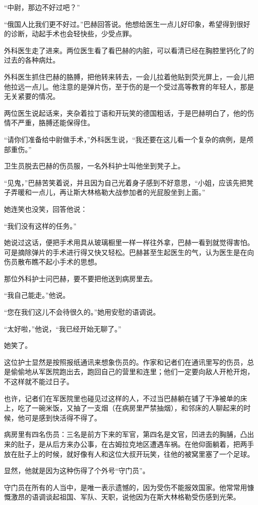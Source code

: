 “中尉，那边不好过吧？”

“俄国人比我们更不好过。”巴赫回答说。他想给医生一点儿好印象，希望得到很好的诊断，动起手术也会轻快些，少受点罪。

外科医生走了进来。两位医生看了看巴赫的内脏，可以看清已经在胸腔里钙化了的过去的各种病灶。

外科医生抓住巴赫的胳膊，把他转来转去，一会儿拉着他贴到荧光屏上，一会儿把他拉远一点儿。他注意的是弹片伤，至于伤的是一个受过高等教育的年轻人，那是无关紧要的情况。

两位医生说起话来，夹杂着拉丁语和开玩笑的德国粗话，于是巴赫明白了，他的伤情不严重，胳膊还能保得住。

“请你们准备给中尉做手术，”外科医生说，“我还要在这儿看一个复杂的病例，是颅部重伤。”

卫生员脱去巴赫的伤员服，一名外科护士叫他坐到凳子上。

“见鬼，”巴赫苦笑着说，并且因为自己光着身子感到不好意思，“小姐，应该先把凳子弄暖和一点儿，再让斯大林格勒大战参加者的光屁股坐到上面。”

她连笑也没笑，回答他说：

“我们没有这样的任务。”

她说过这话，便把手术用具从玻璃橱里一样一样往外拿，巴赫一看到就觉得害怕。可是摘除弹片的手术进行得又快又轻松。巴赫甚至生起医生的气，认为医生是在向伤员散布瞧不起小手术的思想。

那位外科护士问巴赫，要不要把他送到病房里去。

“我自己能走。”他说。

“您在我们这儿不会待很久的。”她用安慰的语调说。

“太好啦，”他说，“我已经开始无聊了。”

她笑了。

这位护士显然是按照报纸通讯来想象伤员的。作家和记者们在通讯里写的伤员，总是偷偷地从军医院跑出去，跑回自己的营里和连里；他们一定要向敌人开枪开炮，不这样就不能过日子。

也许，记者们在军医院里也碰见过这样的人，不过当巴赫躺在铺了干净被单的床上，吃了一碗米饭，又抽了一支烟（在病房里严禁抽烟），和邻床的人聊起来的时候，他可是感到快活得不得了。

病房里有四名伤员：三名是前方下来的军官，第四名是文官，凹进去的胸脯，凸出来的肚子，是从后方来办公事，在古姆拉克地区遭遇车祸。在他仰面躺着，把两手放在肚子上的时候，就好像有人和这位大叔开玩笑，往他的被窝里塞了一个足球。

显然，他就是因为这种伤得了个外号“守门员”。

守门员在所有的人当中，是唯一表示遗憾的，因为受伤不能报效国家。他常常用慷慨激昂的语调谈起祖国、军队、天职，说他因为在斯大林格勒受伤感到光荣。

